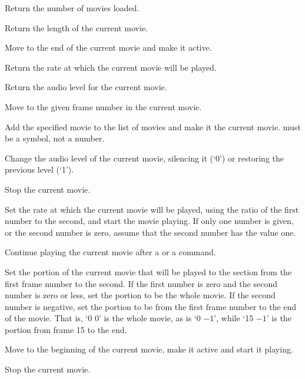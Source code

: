   Return the number of movies loaded.

  Return the length of the current movie.

  Move to the end of the current movie and make it active.

  Return the rate at which the current movie will be played.

  Return the audio level for the current movie.

  Move to the given frame number in the current movie.

  Add the specified movie to the list of movies and make it the current movie.
   must be a symbol, not a number.

  Change the audio level of the current movie, silencing it (`0') or restoring the previous level
  (`1').

  Stop the current movie.

  Set the rate at which the current movie will be played, using the ratio of the first number to
  the second, and start the movie playing.
  If only one number is given, or the second number is zero, assume that the second number has
  the value one.

  Continue playing the current movie after a  or a  command.

  Set the portion of the current movie that will be played to the section from the first frame
  number to the second.
  If the first number is zero and the second number is zero or less, set the portion to be the
  whole movie.
  If the second number is negative, set the portion to be from the first frame number to the end
  of the movie.
  That is, `0 0' is the whole movie, as is `0 $-1$', while `15 $-1$' is the portion from frame 15
  to the end.

  Move to the beginning of the current movie, make it active and start it playing.

  Stop the current movie.

